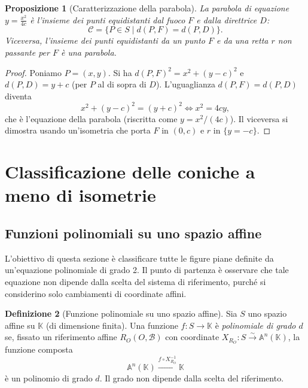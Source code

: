 \documentclass[11pt, a4paper]{book}
\theoremstyle{definition}
\newtheorem{definizione}{Definizione}[section]
\theoremstyle{plain}
\newtheorem{proposizione}[definizione]{Proposizione}
\theoremstyle{remark}
\newcommand{\K}{\mathbb{K}}
\begin{document}
\begin{proposizione}[Caratterizzazione della parabola]
\label{prop:foc-par}
La parabola di equazione $y = \frac{x^2}{4c}$ è l'insieme dei punti equidistanti dal fuoco $F$ e dalla direttrice $D$:
\[
  \mathcal{C} = \bigl\{ P \in S \;\big|\; d(P,F) = d(P,D) \bigr\}.
\]
Viceversa, l'insieme dei punti equidistanti da un punto $F$ e da una retta $r$ non passante per $F$ è una parabola.
\end{proposizione}

\begin{proof}
Poniamo $P = (x,y)$. Si ha $d(P,F)^2 = x^2 + (y-c)^2$ e $d(P,D) = y+c$ (per $P$ al di sopra di $D$). L'uguaglianza $d(P,F) = d(P,D)$ diventa
\[
  x^2 + (y-c)^2 = (y+c)^2 \iff x^2 = 4cy,
\]
che è l'equazione della parabola (riscritta come $y = x^2/(4c)$). Il viceversa si dimostra usando un'isometria che porta $F$ in $(0,c)$ e $r$ in $\{y = -c\}$.
\end{proof}

\section{Classificazione delle coniche a meno di isometrie}
\label{sec:class-coniche}

\subsection{Funzioni polinomiali su uno spazio affine}

L'obiettivo di questa sezione è classificare tutte le figure piane definite da un'equazione polinomiale di grado 2. Il punto di partenza è osservare che tale equazione non dipende dalla scelta del sistema di riferimento, purché si considerino solo cambiamenti di coordinate affini.

\begin{defbox}
\begin{definizione}[Funzione polinomiale su uno spazio affine]
\label{def:pol-affine}
Sia $S$ uno spazio affine su $\K$ (di dimensione finita). Una funzione $f \colon S \to \K$ è \emph{polinomiale di grado $d$} se, fissato un riferimento affine $R_O(O, \mathcal{B})$ con coordinate $X_{R_O} \colon S \xrightarrow{\sim} \mathbb{A}^n(\K)$, la funzione composta
\[
  \mathbb{A}^n(\K) \xrightarrow{f \circ X_{R_O}^{-1}} \K
\]
è un polinomio di grado $d$. Il grado non dipende dalla scelta del riferimento.
\end{definizione}
\end{defbox}
\end{document}
